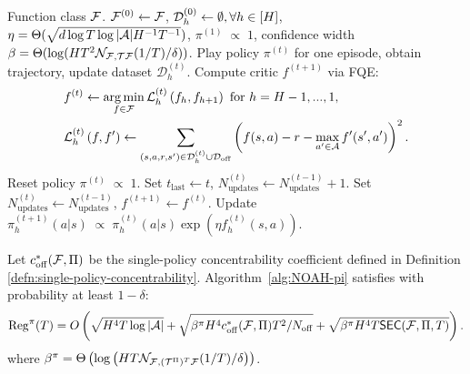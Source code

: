 \begin{algorithm}[t]
    \caption{}
    \begin{algorithmic}[1]
             Function class ${\mathcal{F}}$.
             ${\mathcal{F}}^{(0)} \leftarrow {\mathcal{F}}$, ${\mathcal{D}}_h^{(0)}\leftarrow \emptyset, \forall h \in [H]$, $\eta = \Theta(\sqrt{d\log T \log|{\mathcal{A}}| H^{-1}T^{-1}})$, $\pi^{(1)} \; \propto \; 1$, confidence width $\beta=\Theta(\log (HT^2 \mathcal{N}_{{\mathcal{F}}, {\mathcal{T}} {\mathcal{F}}}(1/T) / \delta))$.
            \STATE Play policy $\pi^{(t)}$ for one episode, obtain trajectory, update dataset $\mathcal{D}_h^{(t)}$.  %
            \STATE Compute critic $f^{(t+1)}$ via FQE:
            \begingroup
            \addtolength\jot{-1ex}
            \begin{align*}
                &f^{(t)} \leftarrow \operatorname*{arg\,min}_{f \in {\mathcal{F}}} \mathcal{L}_h^{(t)}\left(f_h, f_{h+1}\right) \text{ for } h=H-1,...,1,\\
                &\mathcal{L}_h^{(t)}\left(f, f'\right) \gets\sum_{\left(s, a, r, s^{\prime}\right) \in \mathcal{D}_h^{(t)}\cup{\mathcal{D}}_{{\operatorname{off}}}}\left(f(s, a)-r-\max_{a' \in {\mathcal{A}}}f^{\prime}(s^{\prime}, a')\right)^2.
            \end{align*}
            \endgroup
            \STATE Reset policy $\pi^{(t)} \; \propto \; 1$. 
            \STATE Set $t_{\text{last}} \gets t$, $N_{\text{updates}}^{(t)} \gets N_{\text{updates}}^{(t-1)}+ 1$.
            \ELSE
            \STATE Set $N_{\text{updates}}^{(t)} \gets N_{\text{updates}}^{(t-1)}$, $f^{(t+1)} \gets f^{(t)}$.
            \ENDIF
        \STATE Update $\pi_h^{(t+1)}(a|s) \; \propto \; \pi_h^{(t)}(a|s)\exp(\eta f_h^{(t)}(s,a))$.
        \ENDFOR
    \end{algorithmic}
\label{alg:NOAH-star}
\end{algorithm}


\begin{thm}
    Let $c_{{\operatorname{off}}}^*({\mathcal{F}},\Pi)$ be the single-policy concentrability coefficient defined in Definition \ref{defn:single-policy-concentrability}. Algorithm~\ref{alg:NOAH-pi} satisfies with probability at least $1-\delta$:
    \begin{align}
        \mathrm{Reg}^\pi(T)
        = O\left(\sqrt{H^4 T \log|{\mathcal{A}}|} + \sqrt{\beta^\pi H^4 c_{{\operatorname{off}}}^*({\mathcal{F}},\Pi)T^2/N_{{\operatorname{off}}}} + \sqrt{\beta^\pi H^4 T\mathsf{SEC}({\mathcal{F}}, \Pi, T)}\right).
    \end{align}
    where  $\beta^\pi = \Theta\left(\log \left(HT \mathcal{N}_{{\mathcal{F}}, ({\mathcal{T}}^{\Pi})^T {\mathcal{F}}}(1/T) / \delta\right)\right)$.
    \label{thm:hybrid-noah-pi}
\end{thm}

